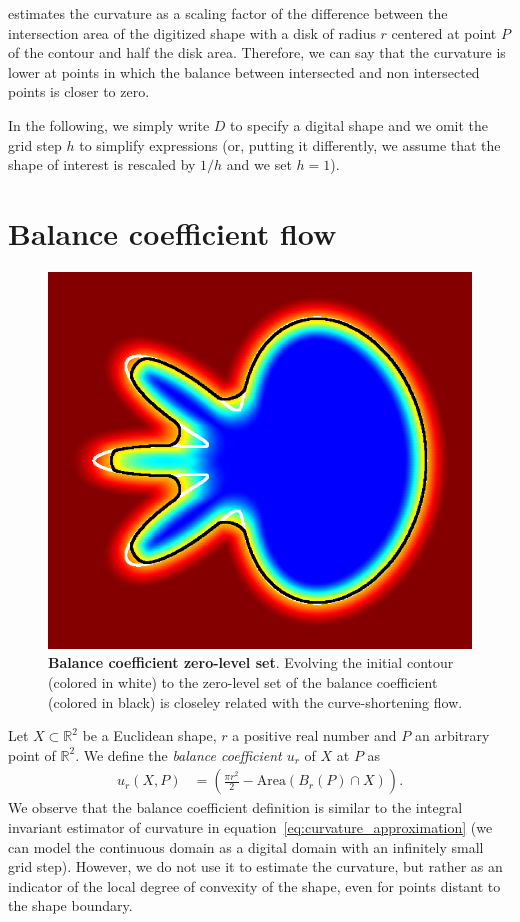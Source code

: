 \documentclass[review]{siamart220329}
\newcommand{\R}{\mathbb{R}}
\begin{document}
 estimates the curvature as a scaling factor of
the difference between the intersection area of the digitized shape with a disk
of radius $r$ centered at point $P$ of the contour and half the disk area.
Therefore, we can say that the curvature is lower at points in which the balance
between intersected and non intersected points is closer to zero.

In the following, we simply write $D$ to specify a digital shape and we omit the
grid step $h$ to simplify expressions (or, putting it differently, we assume
that the shape of interest is rescaled by $1/h$ and we set $h = 1$).
%
%
%
%
%
\section{Balance coefficient flow}
%
%
\begin{figure}
\center
\includegraphics[scale=0.32]{figures/zero-level-set/balance-coefficient-zero-level-set.png}
\caption{\textbf{Balance coefficient zero-level set}. Evolving the initial
contour (colored in white) to the zero-level set of the balance coefficient
(colored in black) is closeley related with the curve-shortening flow.}
\label{fig:balance-coefficient-zero-level-set}
\end{figure}
%
%
Let $X \subset \R^2$ be a Euclidean shape, $r$ a positive real number and $P$ an
arbitrary point of $\R^2$. We define the \emph{balance coefficient $u_r$} of $X$
at $P$ as
%
%
\begin{align*}
  u_r(X,P) &= \left( \frac{\pi r^2}{2} - \text{Area}(B_r(P) \cap X) \right).
\end{align*}
%
%
We observe that the balance coefficient definition is similar to the integral
invariant estimator of curvature in equation~\cref{eq:curvature_approximation}
(we can model the continuous domain as a digital domain with an infinitely small
grid step). However, we do not use it to estimate the curvature, but rather as
an indicator of the local degree of convexity of the shape, even for points
distant to the shape boundary.
\end{document}

